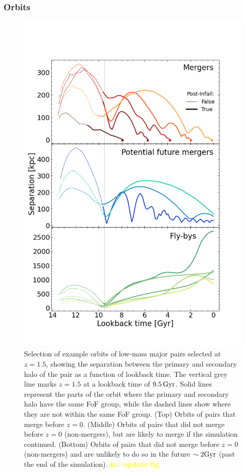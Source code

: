 \documentclass[twocolumn,linenumbers]{aastex631}
\newcommand{\kc}[1]{\textcolor{yellow}{\textbf{kc: #1}} }
\begin{document}
\subsubsection{Orbits} 
\begin{figure}[htb]
    \begin{center}
    \includegraphics[width=\columnwidth, trim={0.4cm 1.75cm 1cm 3.5cm}, clip]{plots/bet-on-it/5_exampleorbits.png}
    \caption{Selection of example orbits of low-mass major pairs selected at $z=1.5$, showing the separation between the primary and secondary halo of the pair as a function of lookback time. The vertical grey line marks $z=1.5$ at a lookback time of $9.5\,\mathrm{Gyr}$.
    Solid lines represent the parts of the orbit where the primary and secondary halo have the same FoF group, while the dashed lines show where they are not within the same FoF group. 
    (Top) Orbits of pairs that merge before $z=0$.
    (Middle) Orbits of pairs that did not merge before $z=0$ (non-mergers), but are likely to merge if the simulation continued. 
    (Bottom) Orbits of pairs that did not merge before $z=0$ (non-mergers) and are unlikely to do so in the future $\sim2\mathrm{Gyr}$ (past the end of the simulation). \kc{update fig}
    }
    \label{fig:example-orbits}
    \end{center}
\end{figure}
\end{document}
